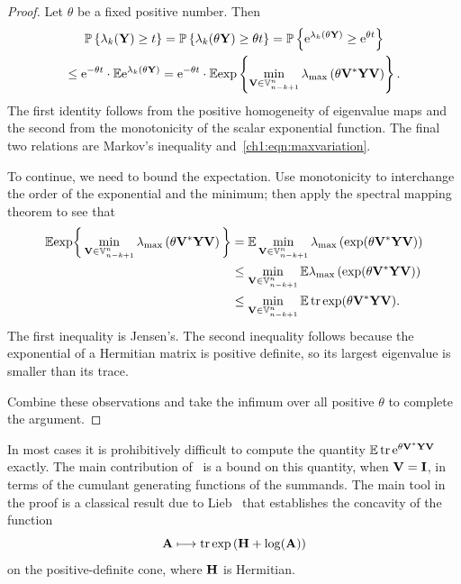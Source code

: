 \begin{proof}
Let $\theta$ be a fixed positive number. Then
\begin{multline*}
\mathbb{P}\left\{\lambda_k(\mathbf{Y}) \geq t\right\}  = 
\mathbb{P}\left\{\lambda_k(\theta \mathbf{Y}) \geq \theta t\right\} = 
\mathbb{P}\left\{\mathrm{e}^{\lambda_k(\theta \mathbf{Y})} \geq \mathrm{e}^{\theta t}\right\} \\
\leq  \mathrm{e}^{-\theta t} \cdot \mathbb{E} \mathrm{e}^{\lambda_k(\theta \mathbf{Y})} = 
\mathrm{e}^{-\theta t} \cdot \mathbb{E} \mathrm{exp}\left\{\min_{\mathbf{V} \in \mathbb{V}_{n-k+1}^{n}}
\lambda_{\mathrm{max}}\left(\theta \mathbf{V}^*\mathbf{YV}\right)\right\}. 
\end{multline*}
The first identity follows from the positive homogeneity of eigenvalue maps and
the second from the monotonicity of the scalar exponential function. The final
two relations are Markov's inequality and~\eqref{ch1:eqn:maxvariation}.

To continue, we need to bound the expectation. Use monotonicity to interchange the order of the
exponential and the minimum; then apply the spectral mapping theorem to see that
\begin{align*}
 \mathbb{E} \mathrm{exp}\bigg\{\min_{\mathbf{V} \in \mathbb{V}_{n-k+1}^{n}} \lambda_{\mathrm{max}}\left(\theta
\mathbf{V}^* \mathbf{YV}\right) \bigg\} & = \mathbb{E} \min_{\mathbf{V} \in \mathbb{V}_{n-k+1}^{n}}
\lambda_{\mathrm{max}}\left(\mathrm{exp}(\theta \mathbf{V}^*\mathbf{YV})\right) \\
  & \leq \min_{\mathbf{V} \in \mathbb{V}_{n-k+1}^{n}} \mathbb{E} \lambda_{\mathrm{max}}\left(\mathrm{exp}(\theta
\mathbf{V}^*\mathbf{YV})\right) \\
  & \leq \min_{\mathbf{V} \in \mathbb{V}_{n-k+1}^{n}} \mathbb{E} \operatorname{tr} \mathrm{exp}(\theta
\mathbf{V}^*\mathbf{YV}).
\end{align*}
The first inequality is Jensen's. The second inequality follows because the
exponential of a Hermitian matrix is positive definite, so its largest
eigenvalue is smaller than its trace.

Combine these observations and take the infimum over all positive $\theta$ to
complete the argument.
\end{proof}

In most cases it is prohibitively difficult to compute the quantity
$\mathbb{E} \operatorname{tr} \mathrm{e}^{\theta \mathbf{V}^*\mathbf{Y V}}$ exactly. The main contribution of~\cite{T10a}
is a bound on this quantity, when $\mathbf{V} = \mathbf{I}$, in terms of the
cumulant generating functions of the summands. The main tool in the proof is a
classical result due to Lieb~\cite[Thm.~6]{Lieb1973} that establishes the concavity of
the function
\begin{equation}
 \mathbf{A} \longmapsto \operatorname{tr}\mathrm{exp}\left(\mathbf{H} + \log(\mathbf{A})\right) \label{ch1:eqn:tracefunctional}
\end{equation}
on the positive-definite cone, where $\mathbf{H}$ is Hermitian.

